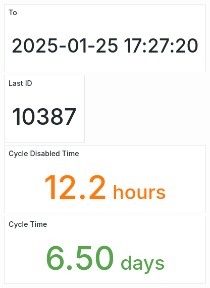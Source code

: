 \documentclass{article}
\begin{document}
\includegraphics[width=\textwidth]{panel_0012-0014.png}
\includegraphics[width=\textwidth]{panel_0012-0022.png}
\includegraphics[width=\textwidth]{panel_0016-0000.png}
\includegraphics[width=\textwidth]{panel_0016-0005.png}
\end{document}
